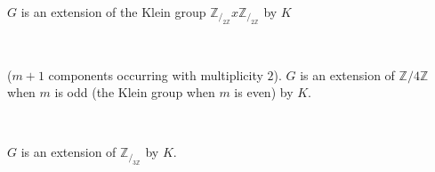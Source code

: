 \begin{case*}[$(C ~4)$ ]~ \pageoriginale

\begin{minipage}{4cm}
  \begin{figure}[H]
  \end{figure}
\end{minipage}\qquad 
\begin{minipage}{4cm}
  $G$ is an extension of the Klein group
  $\mathbb {Z}_{/_{2 \mathbb {Z}}}  x   \mathbb {Z}_{/_{2 \mathbb
      {Z}}}$ by $K$ 
\end{minipage}
\end{case*}

\begin{case*}[$(C ~5_m)$ ]~

  \begin{figure}[H]
  \end{figure}

  ($m+1$ components occurring with multiplicity $2$). $G$ is an
  extension of $\mathbb{Z}/4 \mathbb{Z}$ when $m$ is odd
  (\resp the Klein group when $m$ is even) by $K$. 
\end{case*}

\begin{case*}[$(C ~6)$ ]~ 

\begin{minipage}{5cm}
  \begin{figure}[H]
  \end{figure}
\end{minipage}\qquad 
\begin{minipage}{4.3cm}
  $G$ is an extension of $ \mathbb {Z}_{/_{3 \mathbb {Z}}}$ by $K$.
\end{minipage}
\end{case*}

